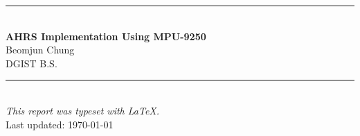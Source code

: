 \thispagestyle{empty}
\clearpage
\vspace*{\fill}

\begin{center}
  \textcolor{accentColor}{\rule{0.4\linewidth}{2pt}}\\[2em]

  {\LARGE\bfseries\color{accentColor} AHRS Implementation Using MPU-9250}\\[0.6em]
  {\large\color{gray} Beomjun Chung}\\[0.4em]
  {\normalsize\color{gray} DGIST B.S.}\\[2em]

  \textcolor{accentColor}{\rule{0.4\linewidth}{2pt}}\\[2em]

  {\small\color{gray} \textit{This report was typeset with \LaTeX.}}\\[0.6em]
  {\small\color{gray} Last updated: \today}
\end{center}

\vspace*{\fill}
